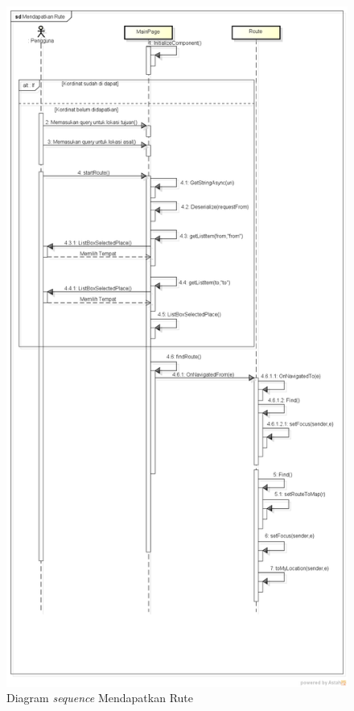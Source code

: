 \begin{figure}[h!]
	\centering
		\includegraphics[scale=0.5]{Gambar/sequence/MendapatkanRute}
	\caption{Diagram \textit{sequence} Mendapatkan Rute}
	\label{fig:sequence rute}
\end{figure}


